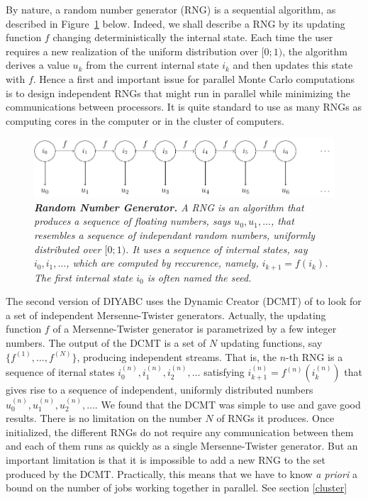By nature, a random number generator (RNG) is a sequential algorithm,
as described in Figure~\ref{fig:rng1} below. Indeed, we shall describe a RNG
by its updating function $f$ changing deterministically the internal
state.  Each time the user requires a new realization of the uniform
distribution over $[0;1)$, the algorithm derives a value $u_k$ from
the current internal state $i_k$ and then updates this state with $f$.
Hence a first and important issue for parallel Monte Carlo
computations is to design independent RNGs that might run in parallel
while minimizing the communications between processors. It is quite
standard to use as many RNGs as computing cores in the computer or in
the cluster of computers. 


\begin{figure}[htb]
\centering \it
\begin{minipage}[c]{.6\linewidth}
  \includegraphics[width=\textwidth]{DCMT_rng.pdf}
  \caption[width=.6\textwidth]{\label{fig:rng1} \it\footnotesize
    \textbf{Random Number Generator.} A RNG is an algorithm
    that produces a sequence
    of floating numbers, says $u_0, u_1, \ldots$, that resembles a
    sequence of independant random numbers, uniformly distributed over
    $[0;1)$.
    It uses a sequence of
    internal states, say $i_0, i_1,\ldots$, which are computed by
    reccurence, namely, $i_{k+1}=f(i_k)$. The first internal state
    $i_0$ is often named the seed.}
\end{minipage}
\end{figure}

The second
version of DIYABC uses the Dynamic Creator (DCMT) of
\citet{DCMT} to look for a set of independent
Mersenne-Twister generators. Actually, the updating function $f$ of a
Mersenne-Twister generator is parametrized by a few integer
numbers. 
The output of the DCMT is a set of $N$ updating functions,
say $\{f^{(1)}, \ldots, f^{(N)}\}$, producing independent streams. 
That is, the $n$-th RNG is a sequence of iternal states
$i_0^{(n)},i_1^{(n)}, i_2^{(n)}, \ldots$ satisfying
$i_{k+1}^{(n)}=f^{(n)}(i_k^{(n)})$
that gives rise to a sequence of independent, uniformly distributed numbers
$u_0^{(n)}, u_1^{(n)}, u_2^{(n)},\ldots$.
We found that the DCMT was simple to use and gave good results.  There
is no limitation on the number $N$ of RNGs it produces. Once initialized,
the different RNGs do not require any communication between them and
each of them runs as quickly as a single Mersenne-Twister
generator. But an important limitation is that it is impossible to add a
new RNG to the set produced by the DCMT. Practically, this means that
we have to know \textit{a priori} a bound on the number of
jobs working together in parallel. See section \ref{cluster}





